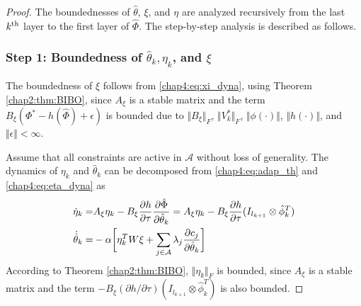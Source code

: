 \begin{proof}

The boundednesses of $\hat\theta$, $\xi$, and $\eta$ are analyzed recursively from the last $k\textsuperscript{th}$ layer to the first layer of $\hat\Phi$. The step-by-step analysis is described as follows.

\subsubsection{
    Step 1: Boundedness of $\hat\theta_k,\eta_k$, and $\xi$
}

The boundedness of $\xi$ follows from \eqref{chap4:eq:xi_dyna}, using Theorem \ref{chap2:thm:BIBO}, since $A_\xi$ is a stable matrix and the term $B_\xi (\Phi^*-h(\hat\Phi)+\epsilon)$ is bounded due to $\Vert B_\xi\Vert_F$, $\Vert V_k^*\Vert_F$, $\Vert \phi(\cdot)\Vert$, $\Vert h(\cdot)\Vert$, and $\Vert\epsilon\Vert <\infty$.

Assume that all constraints are active in $\mathcal A$ without loss of generality. The dynamics of $\eta_k$ and $\hat\theta_k$ can be decomposed from \eqref{chap4:eq:adap_th} and \eqref{chap4:eq:eta_dyna} as 
\begin{equation}
    \begin{aligned}
        \dot\eta_k =
        & 
        A_\xi \eta_k -B_\xi {\partial h\over\partial\tau}{\partial \hat\Phi\over \partial \hat\theta_k}
        =
        A_\xi \eta_k -B_\xi {\partial h\over\partial\tau}(I_{l_{k+1}}\otimes \hat\phi_k^T)\\
        \dot{\hat\theta}_k =
        & -\alpha 
        \bigg[
            \eta_k^TW\xi+
            \sum_{j\in\mathcal{A}}
            \lambda_j{\partial c_j\over\partial \hat\theta_k}
        \bigg]
    \end{aligned} 
\end{equation}
According to Theorem \ref{chap2:thm:BIBO}, $\Vert \eta_k\Vert_F$ is bounded, since $A_\xi$ is a stable matrix and the term $-B_\xi(\partial h/\partial \tau)(I_{l_{k+1}}\otimes\hat\phi_k^T)$ is also bounded.


\end{proof}
